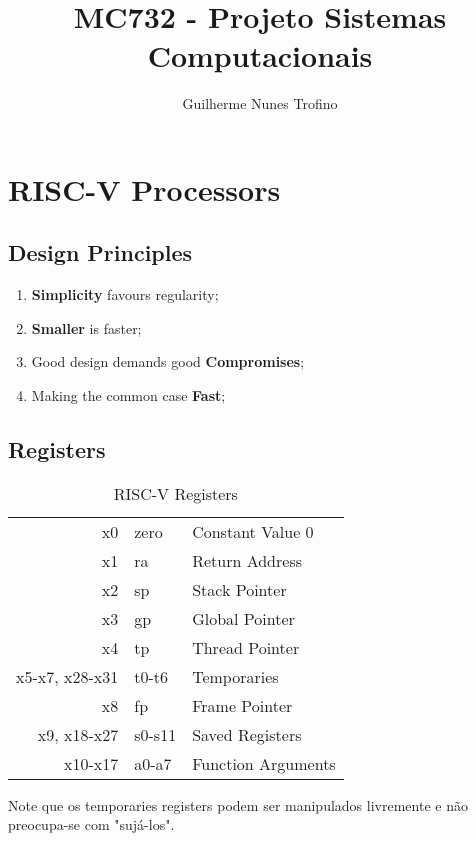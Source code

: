 \documentclass{article}
\title{MC732 - Projeto Sistemas Computacionais}
\author{Guilherme Nunes Trofino}
\begin{document}
    \maketitle
\newpage

    \tableofcontents
\newpage


\section{RISC-V Processors}
\subsection{Design Principles}
    \begin{enumerate}
        \item \textbf{Simplicity} favours regularity;
        \item \textbf{Smaller} is faster;
        \item Good design demands good \textbf{Compromises};
        \item Making the common case \textbf{Fast};
    \end{enumerate}

\subsection{Registers}
    \begin{table}[H]
        \centering\begin{tabular}{rl | l}\hline
            x0              & zero  & Constant Value 0\\
            x1              & ra    & Return Address\\
            x2              & sp    & Stack Pointer\\
            x3              & gp    & Global Pointer\\
            x4              & tp    & Thread Pointer\\
            x5-x7, x28-x31  & t0-t6 & Temporaries\\
            x8              & fp    & Frame Pointer\\
            x9,    x18-x27  & s0-s11& Saved Registers\\
            x10-x17         & a0-a7 & Function Arguments\\\hline
        \end{tabular}
        \caption{RISC-V Registers}
        \label{tab:riscvRegisers}
    \end{table}
\noindent Note que os temporaries registers podem ser manipulados livremente e não preocupa-se com "sujá-los".\\
\end{document}
